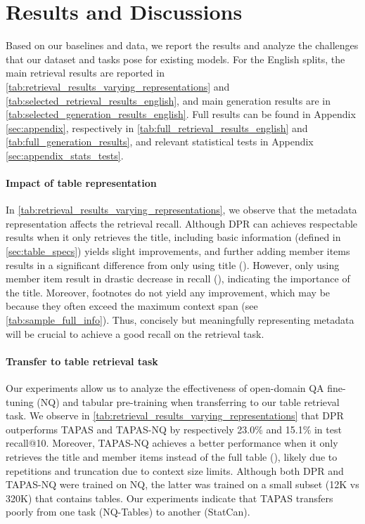 \documentclass[11pt]{article}
\begin{document}
\section{Results and Discussions}
\label{sec:results_analysis}

Based on our baselines and data, we report the results and analyze the challenges that our dataset and tasks pose for existing models. For the English splits, the main retrieval results are reported in \autoref{tab:retrieval_results_varying_representations} and \autoref{tab:selected_retrieval_results_english}, and main generation results are in \autoref{tab:selected_generation_results_english}. Full results can be found in Appendix \ref{sec:appendix}, respectively in \autoref{tab:full_retrieval_results_english} and \autoref{tab:full_generation_results}, and relevant statistical tests in Appendix \ref{sec:appendix_stats_tests}.

\paragraph{Impact of table representation}
In \autoref{tab:retrieval_results_varying_representations}, we observe that the metadata representation affects the retrieval recall. Although DPR can achieves respectable results when it only retrieves the title, including basic information (defined in  \autoref{sec:table_specs}) yields slight improvements, and further adding member items results in a significant difference from only using title (). However, only using member item result in drastic decrease in recall (), indicating the importance of the title. Moreover, footnotes do not yield any improvement, which may be because they often exceed the maximum context span (see \autoref{tab:sample_full_info}). Thus, concisely but meaningfully representing metadata will be crucial to achieve a good recall on the retrieval task.






\paragraph{Transfer to table retrieval task}
Our experiments allow us to analyze the effectiveness of open-domain QA  fine-tuning (NQ) and tabular pre-training when transferring to our table retrieval task. We observe in \autoref{tab:retrieval_results_varying_representations} that DPR outperforms TAPAS and TAPAS-NQ by respectively 23.0\% and 15.1\% in test recall@10. Moreover, TAPAS-NQ achieves a better performance when it only retrieves the title and member items instead of the full table (), likely due to repetitions and truncation due to context size limits. Although both DPR and TAPAS-NQ were trained on NQ, the latter was trained on a small subset (12K vs 320K) that contains tables. Our experiments indicate that TAPAS transfers poorly from one task (NQ-Tables) to another (StatCan).
\end{document}
